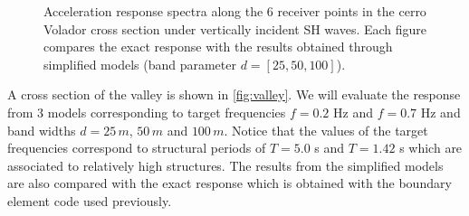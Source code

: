 \documentclass[11pt,letterpaper]{article}
\begin{document}
\begin{figure}[H]
	\center
	\caption{\small Acceleration response spectra along the 6 receiver points in the cerro Volador cross section under vertically incident SH waves. Each figure compares the exact response with the results obtained through simplified models (band parameter $d = [25 , 50 , 100]$).}
 \label{fig:SaptosVolEWSH}
\end{figure}


A cross section of the valley is shown in \cref{fig:valley}. We will evaluate the response from 3 models corresponding to target frequencies  $f=0.2$ Hz and  $f=0.7$ Hz and band widths $d=25 \, m$,   $50 \, m$  and $100 \, m$. Notice that the values of the target frequencies correspond to structural periods of $T = 5.0$ s and $T=1.42$ s which are associated to relatively high structures. The results from the simplified models are also compared with the exact response which is obtained with the boundary element code used previously.
\end{document}
